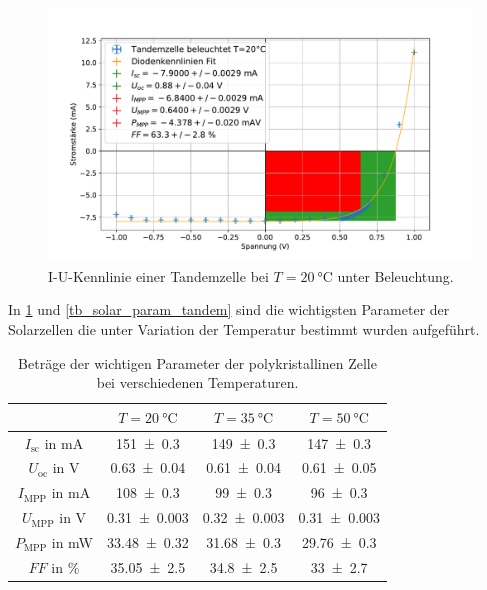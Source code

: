 \documentclass[
	a4paper,
	12pt,
	pagesize,
	ngerman
]{scrartcl}
\begin{document}
	\begin{figure}[H]
			\includegraphics[width=.9\linewidth]{img/Tandemzelle_beleuchtet_20.pdf}
			\caption{
				I-U-Kennlinie einer Tandemzelle bei $T=\SI{20}{\celsius}$ unter Beleuchtung.
								}
			\label{fig_tandem_beleuchtet_20}
	\end{figure}
	In \cref{tb_solar_param_poly} und \cref{tb_solar_param_tandem} sind die wichtigsten Parameter der Solarzellen die unter Variation der Temperatur bestimmt wurden aufgeführt.

\begin{table}[H]
		\centering
		\begin{tabular}{c | c | c | c  }
			 &$T=\SI{20}{\celsius}$& $T=\SI{35}{\celsius}$& $T=\SI{50}{\celsius}$ \\ \hline
			 $I_\text{sc}$ in \si{mA}& \SI{151+-0.3}{}&\SI{149+-0.3}{}& \SI{147+-0.3}{} \\
			 $U_\text{oc}$ in \si{V}&\SI{0.63+-0.04}{}&\SI{0.61+-0.04}{}&\SI{0.61+-0.05}{} \\
			 $I_\text{MPP}$ in \si{mA}&\SI{108+-0.3}{}&\SI{99+-0.3}{}&\SI{96+-0.3}{} \\
			 $U_\text{MPP}$ in \si{V}&\SI{0.31+-0.003}{}&\SI{0.32+-0.003}{}&\SI{0.31+-0.003}{} \\
			 $P_\text{MPP}$ in \si{mW}&\SI{33.48+-0.32}{}&\SI{31.68+-0.3}{}&\SI{29.76+-0.3}{} \\
			 $FF$ in \si{\percent}&\SI{35.05+-2.5}{}&\SI{34.8+-2.5}{}&\SI{33+-2.7}{} \\
		\end{tabular}
		\caption{
		Beträge der wichtigen Parameter der polykristallinen Zelle bei verschiedenen Temperaturen.
		}
		\label{tb_solar_param_poly}
\end{table}
\end{document}
